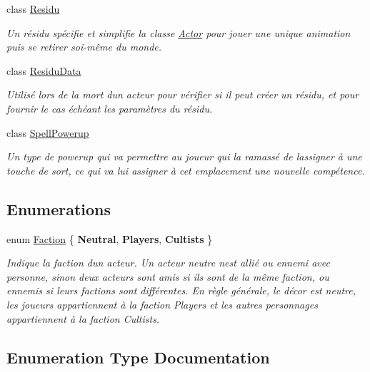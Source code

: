 \begin{DoxyCompactItemize}
class \hyperlink{class_tentacle_slicers_1_1actors_1_1_residu}{Residu}
\begin{DoxyCompactList}\small\item\em Un résidu spécifie et simplifie la classe \hyperlink{class_tentacle_slicers_1_1actors_1_1_actor}{Actor} pour jouer une unique animation puis se retirer soi-\/même du monde. \end{DoxyCompactList}\item 
class \hyperlink{class_tentacle_slicers_1_1actors_1_1_residu_data}{Residu\+Data}
\begin{DoxyCompactList}\small\item\em Utilisé lors de la mort d\textquotesingle{}un acteur pour vérifier si il peut créer un résidu, et pour fournir le cas échéant les paramètres du résidu. \end{DoxyCompactList}\item 
class \hyperlink{class_tentacle_slicers_1_1actors_1_1_spell_powerup}{Spell\+Powerup}
\begin{DoxyCompactList}\small\item\em Un type de powerup qui va permettre au joueur qui l\textquotesingle{}a ramassé de l\textquotesingle{}assigner à une touche de sort, ce qui va lui assigner à cet emplacement une nouvelle compétence. \end{DoxyCompactList}\end{DoxyCompactItemize}
\subsection*{Enumerations}
\begin{DoxyCompactItemize}
\item 
enum \hyperlink{namespace_tentacle_slicers_1_1actors_aaae1293c828d51288c24ab9156ff5475}{Faction} \{ {\bfseries Neutral}, 
{\bfseries Players}, 
{\bfseries Cultists}
 \}\begin{DoxyCompactList}\small\item\em Indique la faction d\textquotesingle{}un acteur. Un acteur neutre n\textquotesingle{}est allié ou ennemi avec personne, sinon deux acteurs sont amis si ils sont de la même faction, ou ennemis si leurs factions sont différentes. En règle générale, le décor est neutre, les joueurs appartiennent à la faction Players et les autres personnages appartiennent à la faction Cultists. \end{DoxyCompactList}
\end{DoxyCompactItemize}


\subsection{Enumeration Type Documentation}
\mbox{\label{namespace_tentacle_slicers_1_1actors_aaae1293c828d51288c24ab9156ff5475}} 

